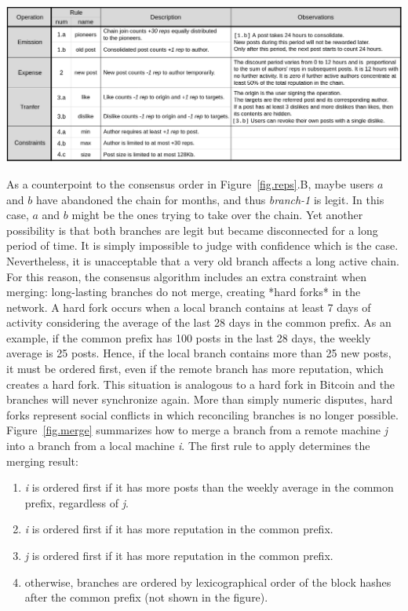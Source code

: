\documentclass[10pt,journal,compsoc]{IEEEtran}
\newcommand{\FC}       {Freechains\xspace}
\newcommand{\nreps}[1] {\emph{#1~reps\xspace}}
\begin{document}
\begin{table}
\centering
\includegraphics[width=\textwidth]{rules.png}
\caption{
    Specific reputation rules for public forum chains in \FC.
    The constants are arbitrary but could be chain parameters
    (e.g., \nreps{30}).
}
\label{fig.rules}
\end{table}

As a counterpoint to the consensus order in Figure~\ref{fig.reps}.B, maybe
users $a$ and $b$ have abandoned the chain for months, and thus \emph{branch-1}
is legit.
In this case, $a$ and $b$ might be the ones trying to take over the chain.
Yet another possibility is that both branches are legit but became disconnected
for a long period of time.
It is simply impossible to judge with confidence which is the case.
Nevertheless, it is unacceptable that a very old branch affects a long active
chain.
For this reason, the consensus algorithm includes an extra constraint when
merging: long-lasting branches do not merge, creating *hard forks* in the
network.
A hard fork occurs when a local branch contains at least 7 days of activity
considering the average of the last 28 days in the common prefix.
As an example, if the common prefix has 100 posts in the last 28 days, the
weekly average is 25 posts.
Hence, if the local branch contains more than 25 new posts, it must be ordered
first, even if the remote branch has more reputation, which creates a hard
fork.
This situation is analogous to a hard fork in Bitcoin and the branches will
never synchronize again.
More than simply numeric disputes, hard forks represent social conflicts in
which reconciling branches is no longer possible.
%
Figure~\ref{fig.merge} summarizes how to merge a branch from a remote machine
\emph{j} into a branch from a local machine \emph{i}.
The first rule to apply determines the merging result:
\begin{enumerate}
    \item \emph{i} is ordered first if it has more posts than the weekly
          average in the common prefix, regardless of \emph{j}.
    \item \emph{i} is ordered first if it has more reputation in the common
          prefix.
    \item \emph{j} is ordered first if it has more reputation in the common
          prefix.
    \item otherwise, branches are ordered by lexicographical order of the block
          hashes after the common prefix (not shown in the figure).
\end{enumerate}
\end{document}
